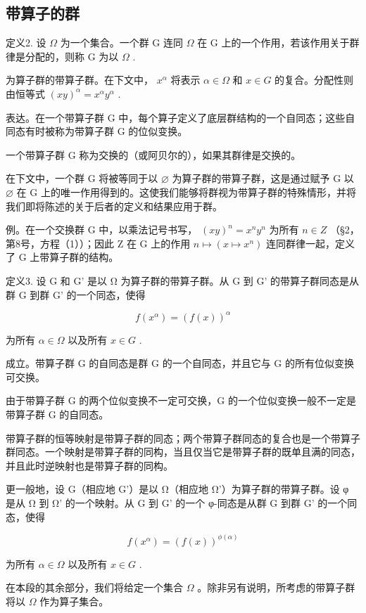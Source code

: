\subsection{带算子的群}

定义2. 设 \(\Omega\) 为一个集合。一个群 G 连同 \(\Omega\) 在 G 上的一个作用，若该作用关于群律是分配的，则称 G 为以 \(\Omega\) .

为算子群的带算子群。在下文中， \(x^{\alpha}\) 将表示 \(\alpha\in\Omega\) 和 \(x\in G\) 的复合。分配性则由恒等式 \((xy)^{\alpha}=x^{\alpha}y^{\alpha}\) .

表达。在一个带算子群 G 中，每个算子定义了底层群结构的一个自同态；这些自同态有时被称为带算子群 G 的位似变换。

一个带算子群 G 称为交换的（或阿贝尔的），如果其群律是交换的。

在下文中，一个群 G 将被等同于以 \(\varnothing\) 为算子群的带算子群，这是通过赋予 G 以 \(\varnothing\) 在 G 上的唯一作用得到的。这使我们能够将群视为带算子群的特殊情形，并将我们即将陈述的关于后者的定义和结果应用于群。

例。在一个交换群 G 中，以乘法记号书写， \((xy)^{n} = x^{n}y^{n}\) 为所有 \(n \in Z\) （§2，第8号，方程（1））；因此 Z 在 G 上的作用 \(n \mapsto (x \mapsto x^{n})\) 连同群律一起，定义了 G 上带算子群的结构。

定义3. 设 G 和 G' 是以 Ω 为算子群的带算子群。从 G 到 G' 的带算子群同态是从群 G 到群 G' 的一个同态，使得

\[
f (x ^ {\alpha}) = (f (x)) ^ {\alpha}
\]

为所有 \(\alpha \in \Omega\) 以及所有 \(x \in G\) .

成立。带算子群 G 的自同态是群 G 的一个自同态，并且它与 G 的所有位似变换可交换。

由于带算子群 G 的两个位似变换不一定可交换，G 的一个位似变换一般不一定是带算子群 G 的自同态。

带算子群的恒等映射是带算子群的同态；两个带算子群同态的复合也是一个带算子群同态。一个映射是带算子群的同构，当且仅当它是带算子群的既单且满的同态，并且此时逆映射也是带算子群的同构。

更一般地，设 G（相应地 G'）是以 Ω（相应地 Ω'）为算子群的带算子群。设 φ 是从 Ω 到 Ω' 的一个映射。从 G 到 G' 的一个 φ-同态是从群 G 到群 G' 的一个同态，使得

\[
f (x ^ {\alpha}) = (f (x)) ^ {\phi (\alpha)}
\]

为所有 \(\alpha \in \Omega\) 以及所有 \(x \in G\) .

在本段的其余部分，我们将给定一个集合 \(\Omega\) 。除非另有说明，所考虑的带算子群将以 \(\Omega\) 作为算子集合。

